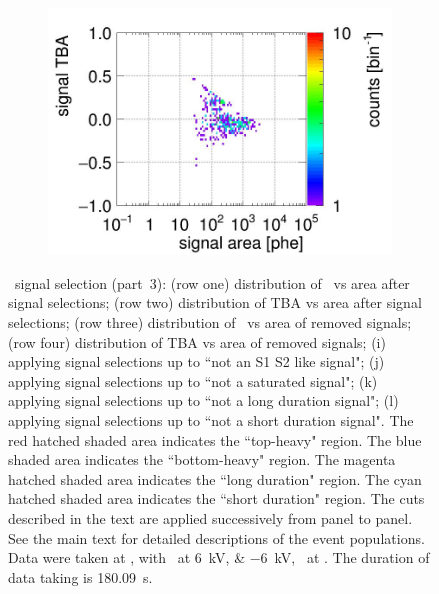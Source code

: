 \begin{landscape}
\begin{figure}[!p]
\begin{subfigure}[t]{0.32\textwidth}
		\includegraphics[width=\figurewidth,clip,trim={0 8 0 40}]{Figures/GasTest/CutsValid/res64767/tbapaX14Vecfig64767.jpg}
		\caption{}
		\label{fig:signal selection 14}
	\end{subfigure}
	\caption[\gtest\ signal selection (part~3).]{\gtest\ signal selection (part~3): 
			(row one) distribution of \rpdshort\ vs area after signal selections;
(row two) distribution of TBA vs area after signal selections;
(row three) distribution of \rpdshort\ vs area of removed signals;
(row four) distribution of TBA vs area of removed signals;
(i) applying signal selections up to ``not an S1 S2 like signal";
(j) applying signal selections up to ``not a saturated signal";
(k) applying signal selections up to ``not a long duration signal";
(l) applying signal selections up to ``not a short duration signal".
The red hatched shaded area indicates the ``top-heavy" region.
The blue shaded area indicates the ``bottom-heavy" region.
The magenta hatched shaded area indicates the ``long duration" region.
The cyan hatched shaded area indicates the ``short duration" region.
		The cuts described in the text are applied successively from panel to panel. See the main text for detailed descriptions of the event populations.
		Data were taken at , with \opvtvb\ at \SIlist{+6;-6}{kV}, \opgd\ at \standarddensity . The duration of data taking is \SI{180.09}{\s}.
	}
	\label{fig:signal selection l3}
\end{figure}
\end{landscape}
